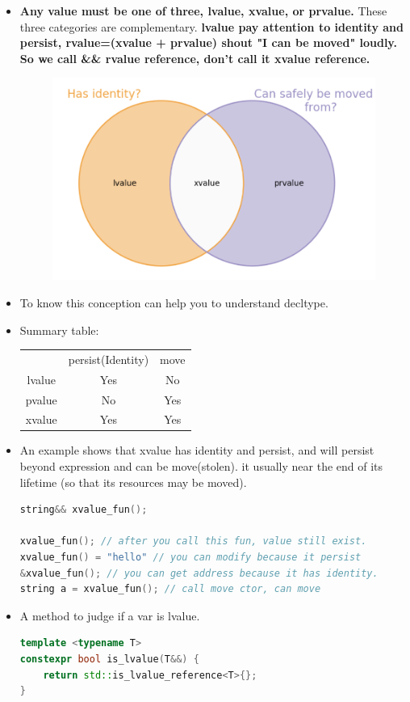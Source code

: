 \documentclass[a4paper,11pt,twoside]{book}
\renewcommand{\hline}{}
\begin{document}
\begin{itemize}
	\item \textbf{Any value must be one of three, lvalue, xvalue, or prvalue.} These three categories are complementary.  \textbf{lvalue pay attention to  identity and persist, rvalue=(xvalue + prvalue) shout "I can be moved" loudly.  So we call \&\& rvalue reference, don't call it xvalue reference. }
	
	\begin{figure}
		\centering
		\includegraphics[width=0.4\linewidth]{pics/xvalue1.png}
		\caption{}
		\label{fig:xvalue1}
	\end{figure}
	
	
	\item To know this conception can help you to understand decltype. 
	
	\item Summary table: \newline
	\begin{tabular}{|c|c|c|}
		\hline
		& persist(Identity) & move \\
		\hline
		lvalue & Yes & No \\
		\hline
		pvalue & No & Yes \\
		\hline
		xvalue & Yes & Yes \\
		\hline
	\end{tabular}

\item An example shows that xvalue has identity and persist, and will persist beyond expression and can be move(stolen). it usually near the end of its lifetime (so that its resources may be moved).
\begin{lstlisting}[frame=single, language=c++, mathescape=true]
string&& xvalue_fun();

xvalue_fun(); // after you call this fun, value still exist.
xvalue_fun() = "hello" // you can modify because it persist
&xvalue_fun(); // you can get address because it has identity.
string a = xvalue_fun(); // call move ctor, can move
\end{lstlisting}

\item A method to judge if a var is lvalue.
\begin{lstlisting}[frame=single, language=c++]
template <typename T>
constexpr bool is_lvalue(T&&) {
	return std::is_lvalue_reference<T>{};
}


\end{lstlisting}
\end{itemize}
\end{document}
